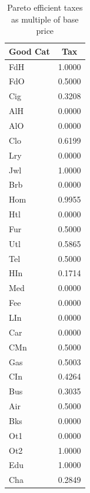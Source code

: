 \documentclass[12pt]{article}
\begin{document}
\begin{table}
    \begin{center}
	\begin{tabular}{|l|c|}
	    \hline
	    \textbf{Good Cat} & \textbf{Tax} \\
	    \hline
	    FdH &  1.0000\\
	    \hline
	    FdO &  0.5000\\ 
	    \hline
	    Cig &  0.3208\\ 
	    \hline
	    AlH &  0.0000\\ 
	    \hline
	    AlO &  0.0000\\ 
	    \hline
	    Clo &  0.6199\\ 
	    \hline
	    Lry &  0.0000\\ 
	    \hline
	    Jwl &  1.0000\\ 
	    \hline
	    Brb &  0.0000\\ 
	    \hline
	    Hom &  0.9955\\ 
	    \hline
	    Htl &  0.0000\\ 
	    \hline
	    Fur &  0.5000\\ 
	    \hline
	    Utl &  0.5865\\ 
	    \hline
	    Tel &  0.5000\\ 
	    \hline
	    HIn &  0.1714\\ 
	    \hline
	    Med &  0.0000\\ 
	    \hline
	    Fee &  0.0000\\ 
	    \hline
	    LIn &  0.0000\\ 
	    \hline
	    Car &  0.0000\\ 
	    \hline
	    CMn &  0.5000\\ 
	    \hline
	    Gas &  0.5003\\ 
	    \hline
	    CIn &  0.4264\\ 
	    \hline
	    Bus &  0.3035\\ 
	    \hline
	    Air &  0.5000\\ 
	    \hline
	    Bks &  0.0000\\ 
	    \hline
	    Ot1 &  0.0000\\ 
	    \hline
	    Ot2 &  1.0000\\ 
	    \hline
	    Edu &  1.0000\\ 
	    \hline
	    Cha &  0.2849\\ 
	    \hline
	\end{tabular}
    \end{center}
    \caption{Pareto efficient taxes as multiple of base price}
    \label{tab:opttax}
\end{table}
\end{document}
